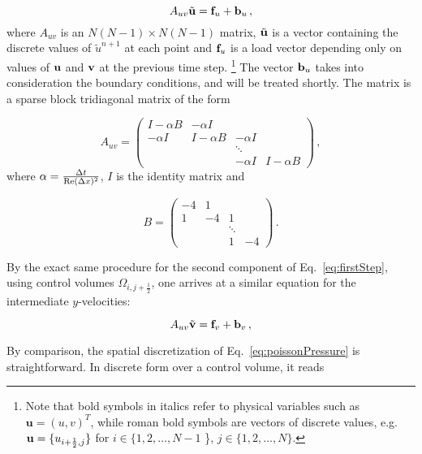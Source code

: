 \documentclass[final,3p,twocolumn]{elsarticle}
\begin{document}
\begin{equation}
    A_{uv} \tilde{\bf u} = {\bf f}_u + {\bf b}_u \,,
    \label{eq:xVelocityMatrix}
\end{equation}
%
where $A_{uv}$ is an $N(N-1) \times N(N-1)$ matrix, $\tilde{\bf u}$ is a vector
containing the discrete values of $\tilde{u}^{n+1}$ at each point and ${\bf
f}_u$ is a load vector depending only on values of ${\bf u}$ and ${\bf v}$ at
the previous time step. \footnote{Note that bold symbols in italics refer to
physical variables such as $\bm{u}=(u,v)^T$, while roman bold symbols are
vectors of discrete values, e.g.\ ${\bf u} = \{u_{i+\frac{1}{2},j}\}$
for $i \in \{ 1,2,\dots,N-1$ \}, $j \in \{ 1,2,\dots,N \}$.} The vector ${\bf b}_u$ takes into
consideration the boundary conditions, and will be treated shortly. The matrix
is a sparse block tridiagonal matrix of the form

\begin{equation*}
    A_{uv} = 
    \begin{pmatrix}
        I - \alpha B & -\alpha I \\
        -\alpha I & I - \alpha B & -\alpha I \\
        & & \ddots \\
        & & -\alpha I & I - \alpha B
    \end{pmatrix} \,,
\end{equation*}
%
where $\alpha = \frac{\Delta t}{{\rm Re}(\Delta x)^2}$, $I$ is the identity
matrix and

\begin{equation*}
    B = 
    \begin{pmatrix}
        -4 & 1 \\
        1 & -4 & 1 \\
        & & \ddots \\ 
        & & 1 & -4
    \end{pmatrix} \,.
\end{equation*}

By the exact same procedure for the second component of Eq.\
\eqref{eq:firstStep}, using control volumes $\Omega_{i,j+\frac{1}{2}}$, one
arrives at a similar equation for the intermediate $y$-velocities: 

\begin{equation}
    A_{uv} \tilde{\bf v} = {\bf f}_v + {\bf b}_v \,,
    \label{eq:yVelocityMatrix}
\end{equation}

By comparison, the spatial discretization of Eq.\ \eqref{eq:poissonPressure} is
straightforward. In discrete form over a control volume, it reads 
\end{document}

